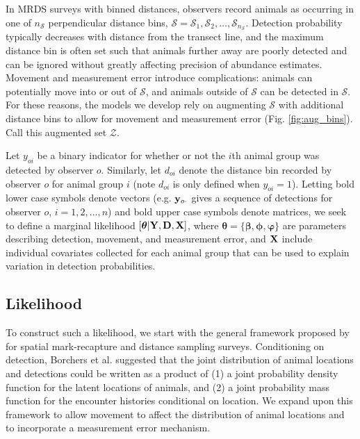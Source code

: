 \documentclass[12pt,fleqn]{article}
\begin{document}
In MRDS surveys with binned distances, observers record animals as occurring in one of $n_\mathcal{S}$ perpendicular distance bins, $\mathcal{S} = \mathcal{S}_1,\mathcal{S}_2,\hdots,\mathcal{S}_{n_\mathcal{S}}$.  Detection probability typically decreases with distance from the transect line, and the maximum distance bin is often set such that animals further away are poorly detected and can be ignored without greatly affecting precision of abundance estimates.  Movement and measurement error introduce complications: animals can potentially move into or out of $\mathcal{S}$, and animals outside of $\mathcal{S}$ can be detected in $\mathcal{S}$.  For these reasons, the models we develop rely on augmenting $\mathcal{S}$ with additional distance bins to allow for movement and measurement error (Fig. \ref{fig:aug_bins}).  Call this augmented set $\mathcal{Z}$.

Let $y_{oi}$ be a binary indicator for whether or not the $i$th animal group was detected by observer $o$.  Similarly, let $d_{oi}$ denote the distance bin recorded by observer $o$ for animal group $i$ (note $d_{oi}$ is only defined when $y_{oi}=1$). Letting bold lower case symbols denote vectors (e.g. ${\bf y}_{o \cdot}$ gives a sequence of detections for observer $o$, $i=1,2,\hdots,n$) and bold upper case symbols denote matrices, we seek to define a marginal likelihood $[\boldsymbol{\theta} | {\bf Y},{\bf D}, {\bf X}]$, where $\boldsymbol{\theta}= \{ \boldsymbol{\beta,\phi,\varphi} \}$ are parameters describing detection, movement, and measurement error, and ${\bf X}$ include individual covariates collected for each animal group that can be used to explain variation in detection probabilities.

\subsection{Likelihood}

To construct such a likelihood, we start with the general framework proposed by \citet{BorchersEtAl2015} for spatial mark-recapture and distance sampling surveys.  Conditioning on detection, Borchers et al. suggested that the joint distribution of animal locations and detections could be written as a product of (1) a joint probability density function for the latent locations of animals, and (2) a joint probability mass function for the encounter histories conditional on location.  We expand upon this framework to allow movement to affect the distribution of animal locations and to incorporate a measurement error mechanism.
\end{document}
